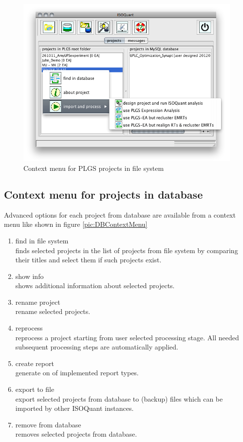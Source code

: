 \documentclass[]{article}
\providecommand{\tightlist}{%
  \setlength{\itemsep}{0pt}\setlength{\parskip}{0pt}}
\begin{document}
\begin{figure}[htbp]
\centering
\includegraphics{pic/fs_context.png}
\caption{Context menu for PLGS projects in file system
\label{pic:FSContextMenu}}
\end{figure}

\clearpage

\subsection{Context menu for projects in
database}\label{context-menu-for-projects-in-database}

Advanced options for each project from database are available from a
context menu like shown in figure \ref{pic:DBContextMenu}

\begin{enumerate}
\def\labelenumi{\arabic{enumi}.}
\tightlist
\item
  find in file system\\
  finds selected projects in the list of projects from file system by
  comparing their titles and select them if such projects exist.
\item
  show info\\
  shows additional information about selected projects.
\item
  rename project\\
  rename selected projects.
\item
  reprocess\\
  reprocess a project starting from user selected processing stage. All
  needed subsequent processing steps are automatically applied.
\item
  create report\\
  generate on of implemented report types.
\item
  export to file\\
  export selected projects from database to (backup) files which can be
  imported by other ISOQuant instances.
\item
  remove from database\\
  removes selected projects from database.
\end{enumerate}
\end{document}
